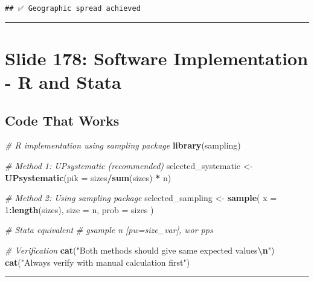 \documentclass[
]{article}
\newenvironment{Shaded}{\begin{snugshade}}{\end{snugshade}}
\newcommand{\AttributeTok}[1]{\textcolor[rgb]{0.13,0.29,0.53}{#1}}
\newcommand{\CommentTok}[1]{\textcolor[rgb]{0.56,0.35,0.01}{\textit{#1}}}
\newcommand{\DecValTok}[1]{\textcolor[rgb]{0.00,0.00,0.81}{#1}}
\newcommand{\FunctionTok}[1]{\textcolor[rgb]{0.13,0.29,0.53}{\textbf{#1}}}
\newcommand{\NormalTok}[1]{#1}
\newcommand{\OtherTok}[1]{\textcolor[rgb]{0.56,0.35,0.01}{#1}}
\newcommand{\SpecialCharTok}[1]{\textcolor[rgb]{0.81,0.36,0.00}{\textbf{#1}}}
\newcommand{\StringTok}[1]{\textcolor[rgb]{0.31,0.60,0.02}{#1}}
\begin{document}
\begin{verbatim}
## ✅ Geographic spread achieved
\end{verbatim}

\begin{center}\rule{0.5\linewidth}{0.5pt}\end{center}

\section{Slide 178: Software Implementation - R and
Stata}\label{slide-178-software-implementation---r-and-stata}

\subsection{Code That Works}\label{code-that-works}

\begin{Shaded}
\begin{Highlighting}[]
\CommentTok{\# R implementation using \textquotesingle{}sampling\textquotesingle{} package}
\FunctionTok{library}\NormalTok{(sampling)}

\CommentTok{\# Method 1: UPsystematic (recommended)}
\NormalTok{selected\_systematic }\OtherTok{\textless{}{-}} \FunctionTok{UPsystematic}\NormalTok{(}\AttributeTok{pik =}\NormalTok{ sizes}\SpecialCharTok{/}\FunctionTok{sum}\NormalTok{(sizes) }\SpecialCharTok{*}\NormalTok{ n)}

\CommentTok{\# Method 2: Using sampling package}
\NormalTok{selected\_sampling }\OtherTok{\textless{}{-}} \FunctionTok{sample}\NormalTok{(}
  \AttributeTok{x =} \DecValTok{1}\SpecialCharTok{:}\FunctionTok{length}\NormalTok{(sizes),}
  \AttributeTok{size =}\NormalTok{ n,}
  \AttributeTok{prob =}\NormalTok{ sizes}
\NormalTok{)}

\CommentTok{\# Stata equivalent}
\CommentTok{\# gsample n [pw=size\_var], wor pps }

\CommentTok{\# Verification}
\FunctionTok{cat}\NormalTok{(}\StringTok{"Both methods should give same expected values}\SpecialCharTok{\textbackslash{}n}\StringTok{"}\NormalTok{)}
\FunctionTok{cat}\NormalTok{(}\StringTok{"Always verify with manual calculation first"}\NormalTok{)}
\end{Highlighting}
\end{Shaded}

\begin{center}\rule{0.5\linewidth}{0.5pt}\end{center}
\end{document}
